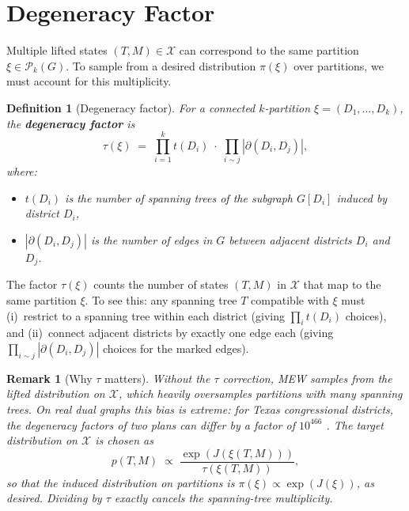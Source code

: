 \documentclass[11pt]{article}
\newtheorem{definition}{Definition}[section]
\newtheorem{remark}{Remark}[section]
\begin{document}
\section{Degeneracy Factor}\label{sec:degeneracy}

Multiple lifted states $(T, M) \in \mathcal{X}$ can correspond to the same partition $\xi \in \mathcal{P}_k(G)$. To sample from a desired distribution $\pi(\xi)$ over partitions, we must account for this multiplicity.

\begin{definition}[Degeneracy factor]\label{def:degeneracy}
For a connected $k$-partition $\xi = (D_1, \ldots, D_k)$, the \textbf{degeneracy factor} is
\[
\tau(\xi) \;=\; \prod_{i=1}^{k} t(D_i) \;\cdot\; \prod_{i \sim j} |\partial(D_i, D_j)|,
\]
where:
\begin{itemize}
\item $t(D_i)$ is the number of spanning trees of the subgraph $G[D_i]$ induced by district $D_i$,
\item $|\partial(D_i, D_j)|$ is the number of edges in $G$ between adjacent districts $D_i$ and $D_j$.
\end{itemize}
\end{definition}

The factor $\tau(\xi)$ counts the number of states $(T, M)$ in $\mathcal{X}$ that map to the same partition $\xi$. To see this: any spanning tree $T$ compatible with $\xi$ must (i)~restrict to a spanning tree within each district (giving $\prod_i t(D_i)$ choices), and (ii)~connect adjacent districts by exactly one edge each (giving $\prod_{i \sim j} |\partial(D_i, D_j)|$ choices for the marked edges).

\begin{remark}[Why $\tau$ matters]
Without the $\tau$ correction, MEW samples from the \emph{lifted} distribution on $\mathcal{X}$, which heavily oversamples partitions with many spanning trees. On real dual graphs this bias is extreme: for Texas congressional districts, the degeneracy factors of two plans can differ by a factor of $10^{466}$ \cite{mew}. The target distribution on $\mathcal{X}$ is chosen as
\[
p(T, M) \;\propto\; \frac{\exp(J(\xi(T,M)))}{\tau(\xi(T,M))},
\]
so that the induced distribution on partitions is $\pi(\xi) \propto \exp(J(\xi))$, as desired. Dividing by $\tau$ exactly cancels the spanning-tree multiplicity.
\end{remark}
\end{document}
